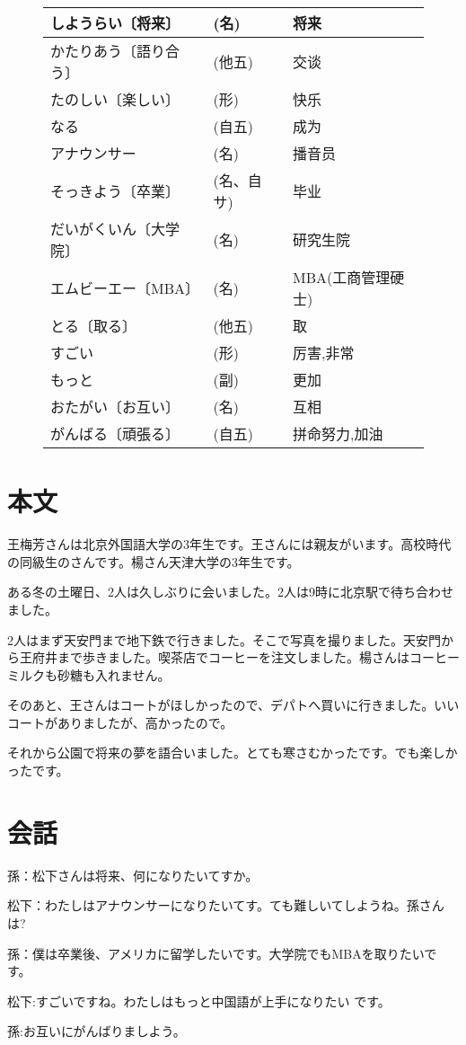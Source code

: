 \begin{figure}[htbp]
\begin{tabular}{l|l|l}
            しようらい〔将来〕& (名)  &  将来    \\\hline
            かたりあう〔語り合う〕& (他五)  & 交谈\\\hline   
            たのしい〔楽しい〕& (形) &   快乐\\\hline
        なる &(自五) & 成为    \\\hline
        アナウンサー & (名) & 播音员\\\hline
        そっきよう〔卒業〕& (名、自サ)&毕业\\\hline
        だいがくいん〔大学院〕& (名) &   研究生院   \\\hline
        エムビーエー〔MBA〕& (名) &   MBA(工商管理硬士)	\\\hline
        とる〔取る〕  & (他五)	&取\\\hline
        すごい	&(形)	&厉害,非常	\\\hline
        もっと	&(副)&	更加	\\\hline
        おたがい〔お互い〕	&(名)	&互相	\\\hline
        がんばる〔頑張る〕&	(自五)&	拼命努力,加油\\\hline
        \end{tabular}
    \end{figure}
    \section{本文}
    王梅芳さんは北京外国語大学の3年生です。王さんには親友がいます。高校時代の同級生のさんです。楊さん天津大学の3年生です。

    ある冬の土曜日、2人は久しぶりに会いました。2人は9時に北京駅で待ち合わせました。

    2人はまず天安門まで地下鉄で行きました。そこで写真を撮りました。天安門から王府井まで歩きました。喫茶店でコーヒーを注文しました。楊さんはコーヒーミルクも砂糖も入れません。

    そのあと、王さんはコートがほしかったので、デパトへ買いに行きました。いいコートがありましたが、高かったので。

    それから公園で将来の夢を語合いました。とても寒さむかったです。でも楽しかったです。
    \section{会話}
    孫：松下さんは将来、何になりたいてすか。

    松下：わたしはアナウンサーになりたいてす。ても難しいてしようね。孫さんは?

    孫：僕は卒業後、アメリカに留学したいです。大学院でもMBAを取りたいです。

    松下:すごいですね。わたしはもっと中国語が上手になりたい
です。

    孫:お互いにがんばりましよう。

